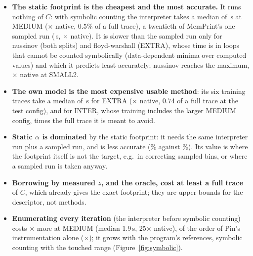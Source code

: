 \documentclass[11pt]{article}
\newcommand{\fittable}[1]{\sbox{\fitbox}{}%
  \ifdim\wd\fitbox>\linewidth\resizebox{\linewidth}{!}{\usebox{\fitbox}}\else\usebox{\fitbox}\fi}
\newcommand{\memprint}{MemPrint}
\newcommand{\figref}[1]{Figure~\ref{#1}}
\newcommand{\tabref}[1]{Table~\ref{#1}}
\begin{document}
\begin{table}[!htbp]
\centering\small
\caption[Cost of each method]{Cost of each method of \tabref{tab:lowo} for the held-out kernel at its test config:
median over the 27 kernels of the seconds, of the ratio to the native run, and of the ratio to a full trace, with the
median MAPE of \tabref{tab:lowo} (\%). ``Runs of $C$'' is what the method needs of the held-out kernel itself.}
\label{tab:overhead}
\fittable{tables/overhead.tex}
\end{table}

\begin{itemize}
\item \textbf{The static footprint is the cheapest and the most accurate.} It runs nothing of $C$: with symbolic
counting the interpreter takes a median of \numovStaticS\,s at MEDIUM (\numovStaticX$\times$ native, 0.5\% of a full
trace), a twentieth of \memprint{}'s one sampled run (\numovSampS\,s, \numovSampX$\times$ native). It is slower than
the sampled run only for nussinov (both splits) and floyd-warshall (EXTRA), whose time is in loops that cannot be
counted symbolically (data-dependent minima over computed values) and which it predicts least accurately; nussinov
reaches the maximum, \numovStaticXmax$\times$ native at SMALL2.
\item \textbf{The own model is the most expensive usable method}: its six training traces take a median of
\numovOwnS\,s for EXTRA (\numovOwnX$\times$ native, 0.74 of a full trace at the test config), and for INTER, whose
training includes the larger MEDIUM config, \numovOwnInterTrace{} times the full trace it is meant to avoid.
\item \textbf{Static $\alpha$ is dominated} by the static footprint: it needs the same interpreter run plus a sampled
run, and is less accurate (\numalphaExtra\% against \numfpExtra\%). Its value is where the footprint itself is not
the target, e.g.\ in correcting sampled bins, or where a sampled run is taken anyway.
\item \textbf{Borrowing by measured $z$, and the oracle, cost at least a full trace} of $C$, which already gives the exact
footprint; they are upper bounds for the descriptor, not methods.
\item \textbf{Enumerating every iteration} (the interpreter before symbolic counting) costs \numcenuCostX$\times$ more
at MEDIUM (median 1.9\,s, 25$\times$ native), of the order of Pin's instrumentation alone (\numovInstrX$\times$); it
grows with the program's references, symbolic counting with the touched range (\figref{fig:symbolic}).
\end{itemize}
\end{document}
